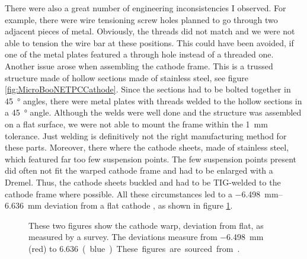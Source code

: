 There were also a great number of engineering inconsistencies I observed. For example, there were wire tensioning screw holes planned to go through two adjacent pieces of metal. Obviously, the threads did not match and we were not able to tension the wire bar at these positions. This could have been avoided, if one of the metal plates featured a through hole instead of a threaded one. Another issue arose when assembling the cathode frame. This is a trussed structure made of hollow sections made of stainless steel, see figure \ref{fig:MicroBooNETPCCathode}. Since the sections had to be bolted together in \SI{45}{\degree} angles, there were metal plates with threads welded to the hollow sections in a \SI{45}{\degree} angle. Although the welds were well done and the structure was assembled on a flat surface, we were not able to mount the frame within the \SI{1}{\milli\metre} tolerance. Just welding is definitively not the right manufacturing method for these parts. Moreover, there where the cathode sheets, made of stainless steel, which featured far too few suspension points. The few suspension points present did often not fit the warped cathode frame and had to be enlarged with a Dremel. Thus, the cathode sheets buckled and had to be TIG-welded to the cathode frame where possible. All these circumstances led to a \SIrange{-6.498}{6.636}{\milli\metre} deviation from a flat cathode \cite{MicroBooNEDetector}, as shown in figure \ref{fig:CathodeWarp}.
\begin{figure}
    \centering
    \caption[MicroBooNE's Cathode Warp]{These two figures show the cathode warp, \ie deviation from flat, as measured by a survey. The deviations measure from \SI{-6.498}{\milli\metre} (red) to \SI{6.636} (blue). These figures are sourced from \cite{MicroBooNEDetector}.}
    \label{fig:CathodeWarp}
\end{figure}
